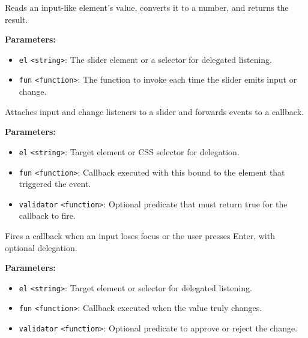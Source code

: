 \documentclass[12pt,a4paper]{article}
\begin{document}
\noindent Reads an input-like element’s value, converts it to a number, and returns the result.

\vspace{5mm}
\noindent {}


\noindent \textbf{Parameters:}
\begin{itemize}
  \item \texttt{el} \texttt{<string>}: The slider element or a selector for delegated listening.
  \item \texttt{fun} \texttt{<function>}: The function to invoke each time the slider emits \textasciigrave{}input\textasciigrave{} or \textasciigrave{}change\textasciigrave{}.
\end{itemize}

\noindent Attaches \textasciigrave{}input\textasciigrave{} and \textasciigrave{}change\textasciigrave{} listeners to a slider and forwards events to a callback.

\vspace{5mm}
\noindent {}


\noindent \textbf{Parameters:}
\begin{itemize}
  \item \texttt{el} \texttt{<string>}: Target element or CSS selector for delegation.
  \item \texttt{fun} \texttt{<function>}: Callback executed with \textasciigrave{}this\textasciigrave{} bound to the element that triggered the event.
  \item \texttt{validator} \texttt{<function>}: Optional predicate that must return \textasciigrave{}true\textasciigrave{} for the callback to fire.
\end{itemize}

\noindent Fires a callback when an input loses focus or the user presses Enter, with optional delegation.

\vspace{5mm}
\noindent {}


\noindent \textbf{Parameters:}
\begin{itemize}
  \item \texttt{el} \texttt{<string>}: Target element or selector for delegated listening.
  \item \texttt{fun} \texttt{<function>}: Callback executed when the value truly changes.
  \item \texttt{validator} \texttt{<function>}: Optional predicate to approve or reject the change.
\end{itemize}
\end{document}
